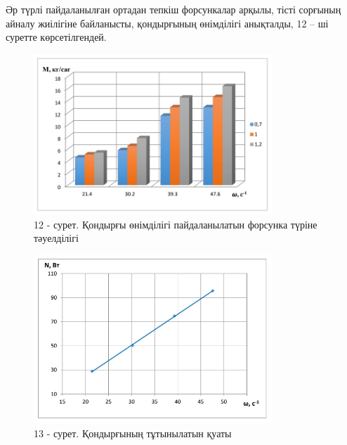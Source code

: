 Әр түрлі пайдаланылған ортадан тепкіш форсункалар арқылы, тісті сорғының
айналу жиілігіне байланысты, қондырғының өнімділігі анықталды, 12 -- ші
суретте көрсетілгендей.


\begin{figure}[H]
	\centering
	\includegraphics[width=0.8\textwidth]{media/pish/image45}
	\caption*{12 - сурет. Қондырғы өнімділігі пайдаланылатын форсунка түріне тәуелділігі}
\end{figure}

\begin{figure}[H]
	\centering
	\includegraphics[width=0.8\textwidth]{media/pish/image46}
	\caption*{13 - сурет. Қондырғының тұтынылатын қуаты}
\end{figure}

